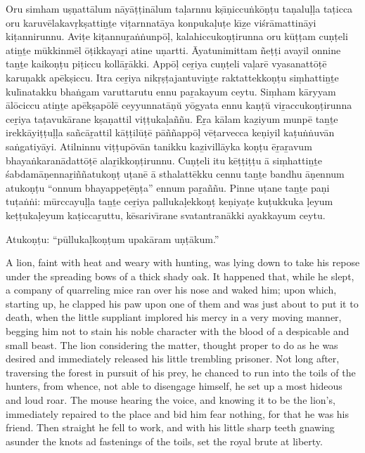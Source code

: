 {\mmtr Oru simham u\d s\d natt\=alum n\=ay\=a\d t\d tin\=alum ta\d larnnu k\d s{\=\i}\d niccu\.nk\=o\d n\d tu 
ta\d nalu\d l\d la ta\d ticca oru karuv\=elakav\d rk\d satti\b n\b te vi\d tarnnat\=aya konpuka\d lu\d te 
k{\=\i}\b ze vi\'sr\=amattin\=ayi ki\d tannirunnu. Avi\d te ki\d tannu\b ra\.n\.nunp\=o\d l, 
kalahiccuko\d n\d tirunna oru k\=u\d t\d tam cu\d n\d teli ati\b n\b te m\=ukkinm\=el 
\=o\d tikkaya\b ri atine u\d nartti. \=Ayatunimittam \~ne\d t\d ti avayil onnine ta\b n\b te 
kaiko\d n\d tu pi\d ticcu koll\=a\b r\=akki. App\=o\d l ce\b riya cu\d n\d teli va\d lar\=e 
vyasanatt\=o\d t\=e karu\d nakk ap\=ek\d siccu. Itra ce\b riya nik\d r\d s\d tajantuvi\b n\b te
raktattekko\d n\d tu si\d mhatti\b n\b te kul{\=\i}natakku bha\.ngam varuttarutu ennu pa\b rakayum
ceytu. Si\d mham k\=aryyam \=al\=ociccu ati\b n\b te ap\=ek\d sap\=ol\=e ceyyunnat\=a\d n\u u
y\=ogyata ennu ka\d n\d t\u u vi\b raccuko\d n\d tirunna ce\b riya ta\d tavuk\=arane k\d sa\d nattil
vi\d t\d tuka\d la\~n\~nu. \=E\b ra k\=alam ka\b ziyum munp\=e ta\b n\b te irekk\=ayi\d t\d tu\d l\d la
sa\~nc\=a\b rattil k\=a\d t\d til\=u\d t\=e p\=a\~n\~napp\=o\d l v\=e\d tarvecca ke\d niyil
ka\d tu\.n\.nuv\=an sa\.ngatiy\=ayi. Atilninnu vi\d t\d tup\=ov\=an tanikku ka\b zivill\=ayka
ko\d n\d tu \=e\b ra\b ravum bhaya\.nkaran\=adatt\=o\d t\=e ala\b rikko\d n\d tirunnu.
Cu\d n\d teli itu k\=e\d t\d ti\d t\d tu \=a si\d mhatti\b n\b te \'sabdam\=a\d nenna\b ri\~n\~natuko\d n\d t
u\d tan\=e \=a sthalatt\=ekku cennu ta\b n\b te bandhu \=a\d nennum atuko\d n\d tu 
``onnum bhayappe\d t\=e\d n\d ta'' ennum pa\b ra\~n\~nu. Pinne u\d tane
ta\b n\b te pa\d ni tu\d ta\.n\.ni: m\=urccayu\d l\d la ta\b n\b te ce\b riya palluka\d lekko\d n\d t
ke\d niya\d te ku\d tukkuka \d leyum ke\d t\d tuka\d leyum ka\d ticca\b ruttu, k\=esariv{\=\i}rane
svatantran\=akki ayakkayum ceytu.

\smallskip

Atuko\d n\d tu: ``p\=ulluka\d l{}ko\d n\d tum upak\=aram u\d n\d t\=akum.''

}

\bigskip

A lion, faint with heat and weary with hunting, was lying down to take his
repose under the spreading bows of a thick shady oak. It happened that, while 
he slept, a company of quarreling mice ran over his nose and waked him; upon which,
starting up, he clapped his paw upon one of them and was just about to put
it to death, when the little suppliant implored his mercy in a very moving 
manner, begging him not to stain his noble character with the blood of a despicable and
small beast. The lion considering the matter, thought proper to do as he was
desired and immediately released his little trembling prisoner. Not long after, traversing
the forest in pursuit of his prey, he chanced to run into the toils of the hunters,
from whence, not able to disengage himself, he set up a most hideous and loud
roar. The mouse hearing the voice, and knowing it to be the lion's, immediately
repaired to the place and bid him fear nothing, for that he was his friend.
Then straight he fell to work, and with his little sharp teeth gnawing asunder the knots
ad fastenings of the toils, set the royal brute at liberty.

